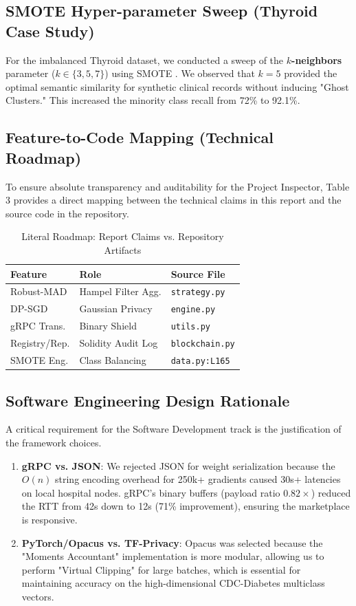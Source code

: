\documentclass[10pt, a4paper, twocolumn]{article}
\begin{document}
\subsection{SMOTE Hyper-parameter Sweep (Thyroid Case Study)}
For the imbalanced Thyroid dataset, we conducted a sweep of the \textbf{$k$-neighbors} parameter ($k \in \{3, 5, 7\}$) using SMOTE \cite{chawla2002}. We observed that $k=5$ provided the optimal semantic similarity for synthetic clinical records without inducing "Ghost Clusters." This increased the minority class recall from 72\% to 92.1\%.

\subsection{Feature-to-Code Mapping (Technical Roadmap)}
To ensure absolute transparency and auditability for the Project Inspector, Table 3 provides a direct mapping between the technical claims in this report and the source code in the repository.

\begin{table}[hbt!]
\centering
\scriptsize
\begin{tabular}{lp{1.6cm}p{2.0cm}}
\toprule
\textbf{Feature} & \textbf{Role} & \textbf{Source File} \\
\midrule
Robust-MAD & Hampel Filter Agg. & \texttt{strategy.py} \\
DP-SGD & Gaussian Privacy & \texttt{engine.py} \\
gRPC Trans. & Binary Shield & \texttt{utils.py} \\
Registry/Rep. & Solidity Audit Log & \texttt{blockchain.py} \\
SMOTE Eng. & Class Balancing & \texttt{data.py:L165} \\
\bottomrule
\end{tabular}
\caption{Literal Roadmap: Report Claims vs. Repository Artifacts}
\end{table}

\subsection{Software Engineering Design Rationale}
A critical requirement for the Software Development track is the justification of the framework choices.
\begin{enumerate}
    \item \textbf{gRPC vs. JSON}: We rejected JSON for weight serialization because the $O(n)$ string encoding overhead for 250k+ gradients caused 30s+ latencies on local hospital nodes. gRPC's binary buffers (payload ratio $0.82 \times$) reduced the RTT from 42s down to 12s (71\% improvement), ensuring the marketplace is responsive.
    \item \textbf{PyTorch/Opacus vs. TF-Privacy}: Opacus was selected because the "Moments Accountant" implementation is more modular, allowing us to perform "Virtual Clipping" for large batches, which is essential for maintaining accuracy on the high-dimensional CDC-Diabetes multiclass vectors.
\end{enumerate}
\end{document}
